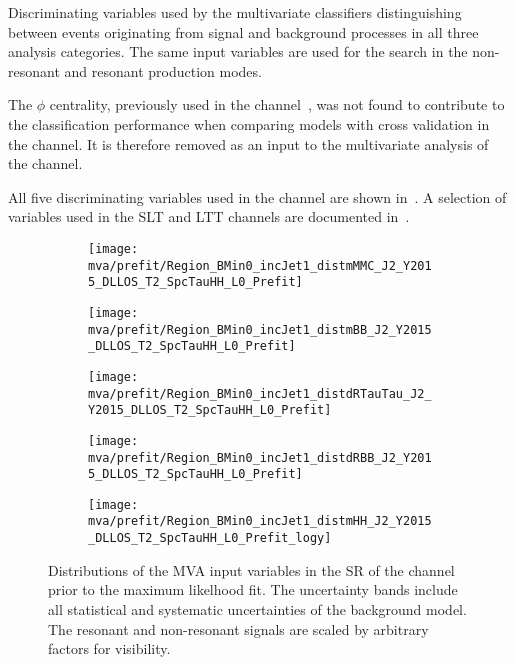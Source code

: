 \begin{table}[htbp]
  \centering

  \caption{Discriminating variables used by the multivariate
    classifiers distinguishing between events originating from signal
    and background processes in all three analysis categories. The
    same input variables are used for the search in the non-resonant
    and resonant production modes.}%
  \label{tab:mva_inputvar}

  
\end{table}

The \pTmiss $\phi$ centrality, previously used in the \hadhad
channel~\cite{HIGG-2016-16-witherratum}, was not found to contribute
to the classification performance when comparing models with cross
validation in the \hadhad channel. It is therefore removed as an input
to the multivariate analysis of the \hadhad channel.

All five discriminating variables used in the \hadhad channel are
shown in~. A selection of variables used in the
\lephad SLT and LTT channels are documented
in~\cite{ATLAS-CONF-2021-030}.



\begin{figure}[htbp]
  \centering

  \begin{subfigure}[t]{.46\textwidth}
    \texttt{[image: mva/prefit/Region\_BMin0\_incJet1\_distmMMC\_J2\_Y2015\_DLLOS\_T2\_SpcTauHH\_L0\_Prefit]}
  \end{subfigure}\hfill %
  \begin{subfigure}[t]{.46\textwidth}
    \texttt{[image: mva/prefit/Region\_BMin0\_incJet1\_distmBB\_J2\_Y2015\_DLLOS\_T2\_SpcTauHH\_L0\_Prefit]}
  \end{subfigure}

  \begin{subfigure}[t]{.46\textwidth}
    \texttt{[image: mva/prefit/Region\_BMin0\_incJet1\_distdRTauTau\_J2\_Y2015\_DLLOS\_T2\_SpcTauHH\_L0\_Prefit]}
  \end{subfigure}\hfill %
  \begin{subfigure}[t]{.46\textwidth}
    \texttt{[image: mva/prefit/Region\_BMin0\_incJet1\_distdRBB\_J2\_Y2015\_DLLOS\_T2\_SpcTauHH\_L0\_Prefit]}
  \end{subfigure}

  \begin{subfigure}[t]{.46\textwidth}
    \texttt{[image: mva/prefit/Region\_BMin0\_incJet1\_distmHH\_J2\_Y2015\_DLLOS\_T2\_SpcTauHH\_L0\_Prefit\_logy]}
  \end{subfigure}

  \caption{Distributions of the MVA input variables in the SR of the
    \hadhad channel prior to the maximum likelhood fit. The
    uncertainty bands include all statistical and systematic
    uncertainties of the background model. The resonant and
    non-resonant \HH signals are scaled by arbitrary factors for
    visibility.}
  \label{fig:mva_inputs}
\end{figure}


